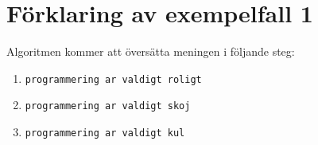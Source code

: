 \section*{Förklaring av exempelfall 1}
Algoritmen kommer att översätta meningen i följande steg:

\begin{enumerate}
    \item \texttt{programmering ar valdigt roligt}
    \item \texttt{programmering ar valdigt skoj}
    \item \texttt{programmering ar valdigt kul}
\end{enumerate}